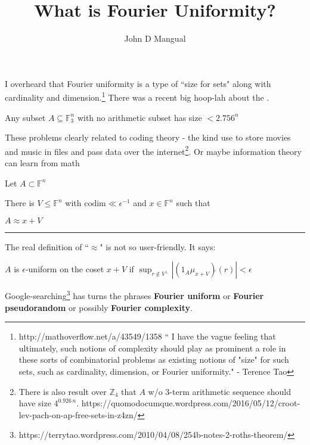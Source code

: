 \documentclass[12pt]{article}
\title{\textbf{ What is Fourier Uniformity? }}
\author{John D Mangual}
\date{}
\begin{document}
\selectfont \fontsize{25}{30}\selectfont

\maketitle

\noindent I overheard that Fourier uniformity is a type of ``size for sets" along with cardinality and dimension.\footnote{http://mathoverflow.net/a/43549/1358 `` I have the vague feeling that ultimately, such notions of complexity should play as prominent a role in these sorts of combinatorial problems as existing notions of "size" for such sets, such as cardinality, dimension, or Fourier uniformity." - Terence Tao} There was a recent big hoop-lah about the {}.  \newline 

Any subset $A \subseteq \mathbb{F}_3^n$ with no arithmetic subset has size $ < 2.756^n $ \newline

\noindent These problems clearly related to coding theory - the kind use to store movies and music in files and pass data over the internet\footnote{ There is also result over $\mathbb{Z}_4$ that $A$ w/o 3-term arithmetic sequence should have size $4^{0.926\,n}$. \newline
https://quomodocumque.wordpress.com/2016/05/12/croot-lev-pach-on-ap-free-sets-in-z4zn/}.  Or maybe information theory can learn from math 

\newpage

Let $A \subset \mathbb{F}^n$ \newline

There is $V \leq \mathbb{F}^n$ with $\mathrm{codim} \ll \epsilon^{-1}$ and $x \in \mathbb{F}^n$ such that \newline 

$A \approx x + V$
\vspace{12pt}
\hrule
\vspace{12pt}
The real definition of ``$\approx$" is not so user-friendly.  It says: \newline

$A$ is $\epsilon$-uniform on the coset $x + V$ if $\displaystyle \sup_{r \notin V^\perp} |(1_A \mu_{x+V})\hat{}(r)| < \epsilon $ \newline

Google-searching\footnote{https://terrytao.wordpress.com/2010/04/08/254b-notes-2-roths-theorem/} has turns the phrases \textbf{Fourier uniform} or \textbf{Fourier pseudorandom} or possibly \textbf{Fourier complexity}. \newline
\end{document}
